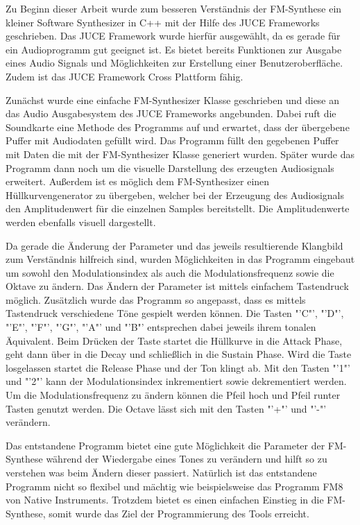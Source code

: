 Zu Beginn dieser Arbeit wurde zum besseren Verständnis der FM-Synthese ein kleiner Software Synthesizer in C++ mit der Hilfe des JUCE Frameworks geschrieben. Das JUCE Framework wurde hierfür ausgewählt, da es gerade für ein Audioprogramm gut geeignet ist. Es bietet bereits Funktionen zur Ausgabe eines Audio Signals und Möglichkeiten zur Erstellung einer Benutzeroberfläche. Zudem ist das JUCE Framework Cross Plattform fähig.

Zunächst wurde eine einfache FM-Synthesizer Klasse geschrieben und diese an das Audio Ausgabesystem des JUCE Frameworks angebunden. Dabei ruft die Soundkarte eine Methode des Programms auf und erwartet, dass der übergebene Puffer mit Audiodaten gefüllt wird. Das Programm füllt den gegebenen Puffer mit Daten die mit der FM-Synthesizer Klasse generiert wurden. Später wurde das Programm dann noch um die visuelle Darstellung des erzeugten Audiosignals erweitert. Außerdem ist es möglich dem FM-Synthesizer einen Hüllkurvengenerator zu übergeben, welcher bei der Erzeugung des Audiosignals den Amplitudenwert für die einzelnen Samples bereitstellt. Die Amplitudenwerte werden ebenfalls visuell dargestellt.

Da gerade die Änderung der Parameter und das jeweils resultierende Klangbild zum Verständnis hilfreich sind, wurden Möglichkeiten in das Programm eingebaut um sowohl den Modulationsindex als auch die Modulationsfrequenz sowie die Oktave zu ändern. Das Ändern der Parameter ist mittels einfachem Tastendruck möglich. Zusätzlich wurde das Programm so angepasst, dass es mittels Tastendruck verschiedene Töne gespielt werden können. Die Tasten "'C"', "'D"', "'E"', "'F"', "'G"', "'A"' und "'B"' entsprechen dabei jeweils ihrem tonalen Äquivalent. Beim Drücken der Taste startet die Hüllkurve in die Attack Phase, geht dann über in die Decay und schließlich in die Sustain Phase. Wird die Taste losgelassen startet die Release Phase und der Ton klingt ab. Mit den Tasten "'1"' und "'2"' kann der Modulationsindex inkrementiert sowie dekrementiert werden. Um die Modulationsfrequenz zu ändern können die Pfeil hoch und Pfeil runter Tasten genutzt werden. Die Octave lässt sich mit den Tasten "'+"' und "'-"' verändern.

Das entstandene Programm bietet eine gute Möglichkeit die Parameter der FM-Synthese während der Wiedergabe eines Tones zu verändern und hilft so zu verstehen was beim Ändern dieser passiert. Natürlich ist das entstandene Programm nicht so flexibel und mächtig wie beispielsweise das Programm FM8 von Native Instruments. Trotzdem bietet es einen einfachen Einstieg in die FM-Synthese, somit wurde das Ziel der Programmierung des Tools erreicht.
\FloatBarrier
